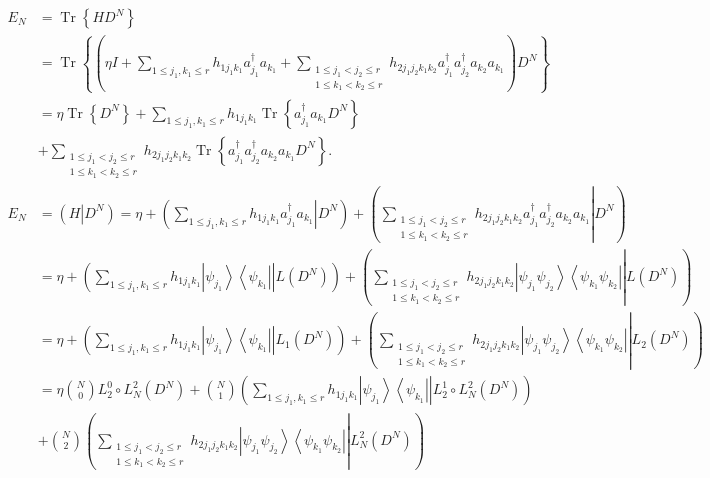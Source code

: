 \documentclass[aps,preprint]{revtex4}%
\begin{document}
\begin{align}
E_{N}  &  =\operatorname{Tr}\left\{  HD^{N}\right\} \nonumber\\
&  =\operatorname{Tr}\left\{  \left(  \eta I+\sum_{1\leq j_{1},k_{1}\leq
r}h_{1j_{1}k_{1}}a_{j_{1}}^{\dagger}a_{k_{1}}+\sum_{\substack{1\leq
j_{1}<j_{2}\leq r\\1\leq k_{1}<k_{2}\leq r}}h_{2j_{1}j_{2}k_{1}k_{2}}a_{j_{1}%
}^{\dagger}a_{j_{2}}^{\dagger}a_{k_{2}}a_{k_{1}}\right)  D^{N}\right\}
\nonumber\\
&  =\eta\operatorname{Tr}\left\{  D^{N}\right\}  +\sum_{1\leq j_{1},k_{1}\leq
r}h_{1j_{1}k_{1}}\operatorname{Tr}\left\{  a_{j_{1}}^{\dagger}a_{k_{1}}%
D^{N}\right\} \nonumber\\
&  +\sum_{\substack{1\leq j_{1}<j_{2}\leq r\\1\leq k_{1}<k_{2}\leq
r}}h_{2j_{1}j_{2}k_{1}k_{2}}\operatorname{Tr}\left\{  a_{j_{1}}^{\dagger
}a_{j_{2}}^{\dagger}a_{k_{2}}a_{k_{1}}D^{N}\right\}  .
\end{align}%
\begin{align}
E_{N}  &  =\left(  H\left\vert D^{N}\right.  \right)  =\eta+\left(  \left.
\sum_{1\leq j_{1},k_{1}\leq r}h_{1j_{1}k_{1}}a_{j_{1}}^{\dagger}a_{k_{1}%
}\right\vert D^{N}\right)  +\left(  \left.  \sum_{\substack{1\leq j_{1}%
<j_{2}\leq r\\1\leq k_{1}<k_{2}\leq r}}h_{2j_{1}j_{2}k_{1}k_{2}}a_{j_{1}%
}^{\dagger}a_{j_{2}}^{\dagger}a_{k_{2}}a_{k_{1}}\right\vert D^{N}\right)
\nonumber\\
&  =\eta+\left(  \left.  \sum_{1\leq j_{1},k_{1}\leq r}h_{1j_{1}k_{1}%
}\left\vert \psi_{j_{1}}\right\rangle \left\langle \psi_{k_{1}}\right\vert
\right\vert L\left(  D^{N}\right)  \right)  +\left(  \left.  \sum
_{\substack{1\leq j_{1}<j_{2}\leq r\\1\leq k_{1}<k_{2}\leq r}}h_{2j_{1}%
j_{2}k_{1}k_{2}}\left\vert \psi_{j_{1}}\psi_{j_{2}}\right\rangle \left\langle
\psi_{k_{1}}\psi_{k_{2}}\right\vert \right\vert L\left(  D^{N}\right)  \right)
\nonumber\\
&  =\eta+\left(  \left.  \sum_{1\leq j_{1},k_{1}\leq r}h_{1j_{1}k_{1}%
}\left\vert \psi_{j_{1}}\right\rangle \left\langle \psi_{k_{1}}\right\vert
\right\vert L_{1}\left(  D^{N}\right)  \right)  +\left(  \left.
\sum_{\substack{1\leq j_{1}<j_{2}\leq r\\1\leq k_{1}<k_{2}\leq r}%
}h_{2j_{1}j_{2}k_{1}k_{2}}\left\vert \psi_{j_{1}}\psi_{j_{2}}\right\rangle
\left\langle \psi_{k_{1}}\psi_{k_{2}}\right\vert \right\vert L_{2}\left(
D^{N}\right)  \right) \\
&  =\eta\binom{N}{0}L_{2}^{0}\circ L_{N}^{2}\left(  D^{N}\right)  +\binom
{N}{1}\left(  \left.  \sum_{1\leq j_{1},k_{1}\leq r}h_{1j_{1}k_{1}}\left\vert
\psi_{j_{1}}\right\rangle \left\langle \psi_{k_{1}}\right\vert \right\vert
L_{2}^{1}\circ L_{N}^{2}\left(  D^{N}\right)  \right) \\
&  +\binom{N}{2}\left(  \left.  \sum_{\substack{1\leq j_{1}<j_{2}\leq r\\1\leq
k_{1}<k_{2}\leq r}}h_{2j_{1}j_{2}k_{1}k_{2}}\left\vert \psi_{j_{1}}\psi
_{j_{2}}\right\rangle \left\langle \psi_{k_{1}}\psi_{k_{2}}\right\vert
\right\vert L_{N}^{2}\left(  D^{N}\right)  \right)
\end{align}%
\end{document}
